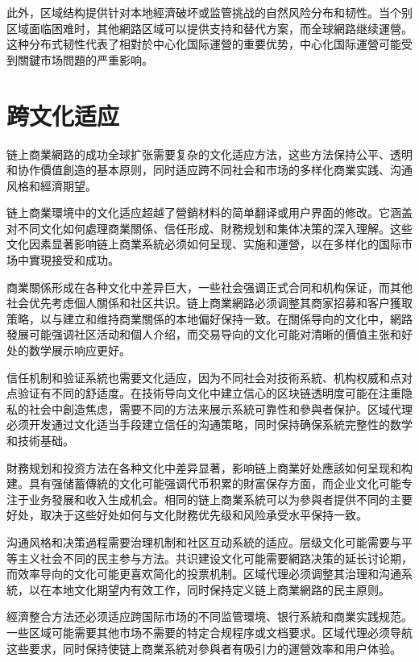 \documentclass[
  Letterpaper,
]{scrbook}
\begin{document}
此外，区域结构提供针对本地經濟破坏或监管挑战的自然风险分布和韧性。当个别区域面临困难时，其他網路区域可以提供支持和替代方案，而全球網路继续運營。这种分布式韧性代表了相對於中心化国际運營的重要优势，中心化国际運營可能受到關鍵市场問題的严重影响。

\section{跨文化适应}\label{ux8de8ux6587ux5316ux9002ux5e94}

链上商業網路的成功全球扩张需要复杂的文化适应方法，这些方法保持公平、透明和协作價值創造的基本原则，同时适应跨不同社会和市场的多样化商業实践、沟通风格和經濟期望。

链上商業環境中的文化适应超越了營銷材料的简单翻译或用户界面的修改。它涵盖对不同文化如何處理商業關係、信任形成、財務规划和集体决策的深入理解。这些文化因素显著影响链上商業系統必须如何呈现、实施和運營，以在多样化的国际市场中實現接受和成功。

商業關係形成在各种文化中差异巨大，一些社会强调正式合同和机构保证，而其他社会优先考虑個人關係和社区共识。链上商業網路必须调整其商家招募和客户獲取策略，以与建立和维持商業關係的本地偏好保持一致。在關係导向的文化中，網路發展可能强调社区活动和個人介绍，而交易导向的文化可能对清晰的價值主张和好处的数学展示响应更好。

信任机制和验证系統也需要文化适应，因为不同社会对技術系統、机构权威和点对点验证有不同的舒适度。在技術导向文化中建立信心的区块链透明度可能在注重隐私的社会中創造焦虑，需要不同的方法来展示系統可靠性和參與者保护。区域代理必须开发通过文化适当手段建立信任的沟通策略，同时保持确保系統完整性的数学和技術基础。

財務规划和投资方法在各种文化中差异显著，影响链上商業好处應該如何呈现和构建。具有强储蓄傳統的文化可能强调代币积累的財富保存方面，而企业文化可能专注于业务發展和收入生成机会。相同的链上商業系統可以为參與者提供不同的主要好处，取决于这些好处如何与文化財務优先级和风险承受水平保持一致。

沟通风格和决策過程需要治理机制和社区互动系統的适应。层级文化可能需要与平等主义社会不同的民主参与方法。共识建设文化可能需要網路决策的延长讨论期，而效率导向的文化可能更喜欢简化的投票机制。区域代理必须调整其治理和沟通系統，以在本地文化期望内有效工作，同时保持定义链上商業網路的民主原则。

經濟整合方法还必须适应跨国际市场的不同监管環境、银行系統和商業实践规范。一些区域可能需要其他市场不需要的特定合规程序或文档要求。区域代理必须导航这些要求，同时保持使链上商業系統对參與者有吸引力的運營效率和用户体验。
\end{document}
